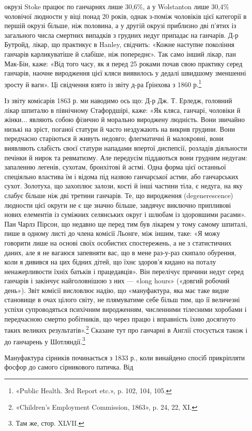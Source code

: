 \parcont{}  %
окрузі Stoke працює по ганчарнях лише 30,6\%, а у Wolstanton
лише 30,4\% чоловічої людности у віці понад 20 років, однак
з-поміж чоловіків цієї категорії в першій окрузі більше, ніж
половина, а у другій окрузі приблизно дві п’ятих із загального
числа смертних випадків з грудних недуг припадає на ганчарів.
Д-р Бутройд, лікар, що практикує в Hanley, свідчить: «Кожне
наступне покоління ганчарів карликуватіше й слабіше, ніж попереднє».
Так само інший лікар, пан Мак-Бін, каже: «Від того
часу, як я перед 25 роками почав свою практику серед ганчарів,
наочне виродження цієї кляси виявилось у дедалі швидшому
зменшенні зросту й ваги». Ці свідчення взято із звіту д-ра
Ґрінхова з 1860 р.\footnote{
«Public Health. Зrd Report etc.», p. 102, 104, 105.
}

Із звіту комісарів 1863 р. ми наводимо ось що: Д-р Дж.
Т. Ерледж, головний лікар шпиталю в північному Стафордшірі,
каже: «Як кляса, ганчарі, чоловіки й жінки... являють собою
фізично й морально вироджену людність. Вони звичайно низькі
на зріст, поганої статури й часто нездужають на викрив грудини.
Вони передчасно старіються й живуть недовго; флегматичні й
малокровні, вони виявляють слабість своєї статури нападами
впертої диспепсії, розладів діяльности печінки й нирок та ревматизму.
Але передусім піддаються вони грудним недугам: запаленню
легенів, сухотам, бронхітові й астмі. Одна форма цієї
останньої спеціяльно властива їм і відома під назвою ганчарської
астми, або ганчарських сухот. Золотуха, що захоплює залози,
кості й інші частини тіла, є недуга, на яку слабує більше ніж
дві третини ганчарів. Те, що виродження (degenerescence) людности
цієї округи не є ще значно більше, завдячує виключно
припливові нових елементів із суміжних селянських округ і
шлюбам із здоровшими расами». Пан Чарлз Пірсон, що недавно
ще перед тим був лікарем у тому самому шпиталі, пише
в одному листі до члена комісії Льонге, між іншим, таке: «Я можу
говорити лише на основі своїх особистих спостережень, а не з
статистичних даних, але я не вагаюся запевняти вас, що в мене
раз-у-раз скипало обурення, коли я дивився на цих бідних
дітей, що їхнє здоров’я кидано на поталу ненажерливости їхніх
батьків і працедавців». Він перелічує причини недуг серед ганчарів
і закінчує найголовнішою з них — «long hours» («довгий
робочий день»). Звіт комісії висловлює надію, що «мануфактура,
яка має таке видне становище в очах цілого світу, не плямуватиме
себе більш тим, що її величезні успіхи супроводяться психічним
виродженням, численними тілесними хоробами і передчасною
смертю робітників, що через працю і вправність їхню
досягнуто таких великих результатів».\footnote{
«Children’s Employment Commission, 1863», p. 24, 22, XI.
} Сказане тут про ганчарні
в Англії стосується також і до ганчарень у Шотляндії.\footnote{
Там же, стор. XLVII.
}

Мануфактура сірників починається з 1833 р., коли винайдено
спосіб прикріпляти фосфор до самого сірникового патичка. Від
\parbreak{}  %
